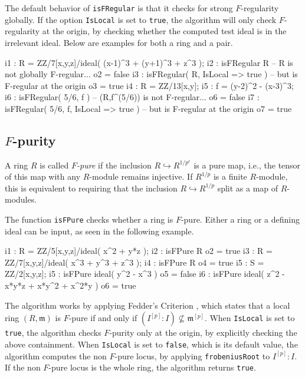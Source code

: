 \documentclass{amsart}
\begin{document}
The default behavior of \texttt{isFRegular} is that it checks for strong $F$-regularity
globally. If the option \texttt{IsLocal} is set to \texttt{true}, the algorithm will only
check $F$-regularity at the origin, by checking whether the computed test ideal is in the irrelevant ideal.
Below are examples for both a ring and a pair.


\medskip
{\small
\begin{MyVerbatim}
i1 : R = ZZ/7[x,y,z]/ideal( (x-1)^3 + (y+1)^3 + z^3 );
i2 : isFRegular R -- R is not globally F-regular...
o2 = false
i3 : isFRegular( R, IsLocal => true ) -- but is F-regular at the origin
o3 = true
i4 : R = ZZ/13[x,y];
i5 : f = (y-2)^2 - (x-3)^3;
i6 : isFRegular( 5/6, f ) -- (R,f^(5/6)) is not F-regular...
o6 = false
i7 : isFRegular( 5/6, f, IsLocal => true ) -- but is F-regular at the origin
o7 = true
\end{MyVerbatim}
}\medskip

\subsection{$F$-purity}
\begin{definition}
A ring $R$ is called \emph{$F$-pure} if
the inclusion $R \hookrightarrow R^{1/p^{e}}$ is a pure map, i.e.,
the tensor of this map with any $R$-module remains injective.  If $R^{1/p}$ is a finite $R$-module, this is equivalent to requiring that the inclusion $R \hookrightarrow R^{1/p}$ split as a map of $R$-modules.
\end{definition}

The function \texttt{isFPure} checks whether a ring is $F$-pure.
Either a ring or a defining ideal can be input, as seen in the following example.


\medskip
{\small
\begin{MyVerbatim}
i1 : R = ZZ/5[x,y,z]/ideal( x^2 + y*z );
i2 : isFPure R
o2 = true
i3 : R = ZZ/7[x,y,z]/ideal( x^3 + y^3 + z^3 );
i4 : isFPure R
o4 = true
i5 : S = ZZ/2[x,y,z];
i5 : isFPure ideal( y^2 - x^3 )
o5 = false
i6 : isFPure ideal( z^2 - x*y*z + x*y^2 + x^2*y )
o6 = true
\end{MyVerbatim}
}\medskip


The algorithm works by applying Fedder's Criterion {\cite{FedderFPureRat}}, which states that a
local ring $(R, \mathfrak{m})$ is $F$-pure if and only if $(I^{[p]} : I)
\not\subseteq \mathfrak{m}^{[p]}$.
When \texttt{IsLocal} is set to \texttt{true}, the algorithm checks $F$-purity only at the origin, by explicitly checking the above
containment. When \texttt{IsLocal} is set to \texttt{false}, which is its default value, the
algorithm computes the non $F$-pure locus, by applying \texttt{frobeniusRoot}
to $I^{[p]} :I$. If the non $F$-pure locus is the whole ring, the algorithm
returns \texttt{true}.
\end{document}
